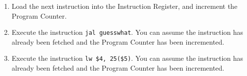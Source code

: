 \documentclass[a4paper,10pt]{article}
\begin{document}
\begin{enumerate}
\begin{enumerate}
\begin{enumerate}
\item Load the next instruction into the Instruction Register, and increment the Program Counter.

\item Execute the instruction \texttt{jal guesswhat}. You can assume the instruction has already been
fetched and the Program Counter has been incremented.

\item Execute the instruction \texttt{lw \$4, 25(\$5)}. You can assume the instruction has already been
fetched and the Program Counter has been incremented.
\end{enumerate}

\end{enumerate}

\end{enumerate}

\newpage
\end{document}
